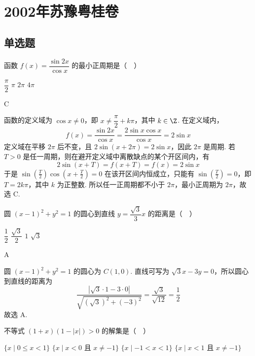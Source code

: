 \chapter{2002年苏豫粤桂卷}
\section{单选题}

\begin{problem}
函数 \(f(x) = \dfrac{\sin 2x}{\cos x}\) 的最小正周期是（\(\quad\)）

\choices
    {\(\dfrac{\pi}{2}\)}
    {\(\pi\)}
    {\(2\pi\)}
    {\(4\pi\)}
\end{problem}

\begin{answer}
C
\end{answer}

\begin{solution}
函数的定义域为 \(\cos x\ne0\)，即 \(x\ne\dfrac{\pi}{2}+k\pi\)，其中 \(k\in\Z\). 在定义域内，
\[
f(x)=\frac{\sin2x}{\cos x}=\frac{2\sin x\cos x}{\cos x}=2\sin x
\]
定义域在平移 \(2\pi\) 后不变，且 \(2\sin(x+2\pi)=2\sin x\)，因此 \(2\pi\) 是周期. 若 \(T>0\) 是任一周期，则在避开定义域中离散缺点的某个开区间内，有
\[
2\sin(x+T)=f(x+T)=f(x)=2\sin x
\]
于是 \(\sin(\frac{T}{2})\cos(x+\frac{T}{2})=0\) 在该开区间内恒成立，只能有 \(\sin(\frac{T}{2})=0\)，即 \(T=2k\pi\)，其中 \(k\) 为正整数. 所以任一正周期都不小于 \(2\pi\)，最小正周期为 \(2\pi\)，故选 C.
\end{solution}

\begin{problem}
圆 \((x - 1)^2 + y^2 = 1\) 的圆心到直线 \(y = \dfrac{\sqrt{3}}{3}x\) 的距离是（\(\quad\)）

\choices
    {\(\dfrac{1}{2}\)}
    {\(\dfrac{\sqrt{3}}{2}\)}
    {\(1\)}
    {\(\sqrt{3}\)}
\end{problem}

\begin{answer}
A
\end{answer}

\begin{solution}
圆 \((x-1)^2+y^2=1\) 的圆心为 \(C(1,0)\). 直线可写为 \(\sqrt{3}x-3y=0\)，所以圆心到直线的距离为
\[
\frac{|\sqrt{3}\cdot1-3\cdot0|}{\sqrt{(\sqrt{3})^2+(-3)^2}}=\frac{\sqrt{3}}{\sqrt{12}}=\frac12
\]
故选 A.
\end{solution}

\begin{problem}
不等式 \((1 + x)(1 - |x|) > 0\) 的解集是（\(\quad\)）

\choices
    {\(\{x \mid 0 \leqslant x < 1\}\)}
    {\(\{x \mid x < 0 \text{ 且 } x \neq -1\}\)}
    {\(\{x \mid -1 < x < 1\}\)}
    {\(\{x \mid x < 1 \text{ 且 } x \neq -1\}\)}
\end{problem}


